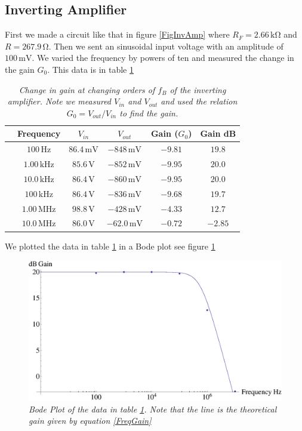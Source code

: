 \documentclass[11pt]{article}
\numberwithin{equation}{section}
\numberwithin{figure}{section}
\numberwithin{table}{section}
\newcommand{\unit}[1]{\ensuremath{\, \mathrm{#1}}}
\begin{document}
\subsection{Inverting Amplifier} 
First we made a circuit like that in figure \ref{FigInvAmp} where $R_F=2.66\unit{k\Omega}$ and $R=267.9\unit{\Omega}$. Then we sent an sinusoidal input voltage with an amplitude of $100\unit{mV}$. We varied the frequency by powers of ten and measured the change in the gain $G_0$. This data is in table \ref{3parta}

\begin{table}[h]
\centering
\begin{tabular}{lccccc}
&Frequency		&$V_{in}$	&$V_{out}$		&Gain ($G_0$)	&Gain dB\\
\hline
&$100\unit{Hz}$		&$86.4\unit{mV}$&$-848\unit{mV}$	&$-9.81$	&$19.8$\\
&$1.00\unit{kHz}$	&$85.6\unit{V}$	&$-852\unit{mV}$	&$-9.95$	&$20.0$\\
&$10.0\unit{kHz}$	&$86.4\unit{V}$	&$-860\unit{mV}$	&$-9.95$	&$20.0$\\
&$100\unit{kHz}$	&$86.4\unit{V}$	&$-836\unit{mV}$	&$-9.68$	&$19.7$\\
&$1.00\unit{MHz}$	&$98.8\unit{V}$	&$-428\unit{mV}$	&$-4.33$	&$12.7$\\
&$10.0\unit{MHz}$	&$86.0\unit{V}$	&$-62.0\unit{mV}$	&$-0.72$	&$-2.85$
\end{tabular}
\caption{\textit{Change in gain at changing orders of $f_B$ of the inverting amplifier. Note we measured $V_{in}$ and $V_{out}$ and used the relation $G_0 = V_{out}/V_{in}$ to find the gain.}}
\label{3parta}
\end{table}
We plotted the data in table \ref{3parta} in a Bode plot see figure \ref{PlotInvAmp}

\begin{figure}[h]
\centering
\includegraphics[scale=0.60]{PlotInvAmp.eps}
\caption{\textit{Bode Plot of the data in table \ref{3parta}. Note that the line is the theoretical gain given by equation \ref{FreqGain}}}
\label{PlotInvAmp}
\end{figure}
\end{document}
